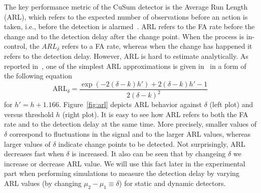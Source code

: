 \documentclass[doctoral,utf8,lot,loar,lof,shortloft,index]{jydiss}
\begin{document}
The key performance metric of the CuSum detector is the Average Run Length (ARL), which refers to the expected number of observations before an action is taken, i.e., before the detection is alarmed~\cite{Page1954}.
ARL refers to the FA rate before the change and to the detection delay after the change point.
When the process is in-control, the $ARL_{\delta}$ refers to a FA rate, whereas when the change has happened it refers to the detection delay.
However, ARL is hard to estimate analytically.
As reported in~\cite{plasse2021streaming}, one of the simplest ARL approximations is given in~\cite{siegmund2013sequential} in a form of the following equation %
\begin{equation}\label{eq:arl_approximation}
	\text{ARL}_{\delta} = \frac{\exp(-2(\delta-k)h') + 2(\delta - k)h' -1}{2 (\delta - k)^2}
\end{equation}
for $h' = h+1.166$.
Figure~\ref{fig:arl} depicts ARL behavior against $\delta$ (left plot) and versus threshold $h$ (right plot).
It is easy to see how ARL refers to both the FA rate and to the detection delay at the same time.
More precisely, smaller values of $\delta$ correspond to fluctuations in the signal and to the larger ARL values, whereas
larger values of $\delta$ indicate change points to be detected.
Not surprisingly, ARL decreases fast when $\delta$ is increased.
It also can be seen that by changeing $\delta$ we increase or decrease ARL value.
We will use this fact later in the experimental part when performing simulations to measure the detection delay by varying ARL values (by changing $\mu_2-\mu_1 \equiv \delta$) for static and dynamic detectors.
%
\end{document}
